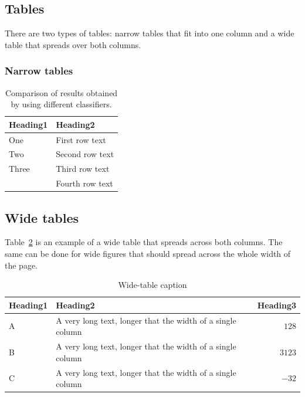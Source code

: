 \documentclass[10pt, a4paper]{article}
\begin{document}
\subsection{Tables}

There are two types of tables: narrow tables that fit into one column and a wide table that spreads over both columns.

\subsubsection{Narrow tables}


\begin{table}
\caption{Comparison of results obtained by using different classifiers.}
\label{tab:classifiers}
\begin{center}
\begin{tabular}{ll}
\toprule
Heading1 & Heading2 \\
\midrule
One & First row text \\
Two   & Second row text \\
Three   & Third row text \\
      & Fourth row text \\
\bottomrule
\end{tabular}
\end{center}
\end{table}

\subsection{Wide tables}

Table~\ref{tab:wide-table} is an example of a wide table that spreads across both columns. The same can be done for wide figures that should spread across the whole width of the page. 

\begin{table}
\caption{Wide-table caption}
\label{tab:wide-table}
\begin{center}
\begin{tabular}{llr}
\toprule
Heading1 & Heading2 & Heading3\\
\midrule
A & A very long text, longer that the width of a single column & $128$\\
B & A very long text, longer that the width of a single column & $3123$\\
C & A very long text, longer that the width of a single column & $-32$\\
\bottomrule
\end{tabular}
\end{center}
\end{table}
\end{document}
